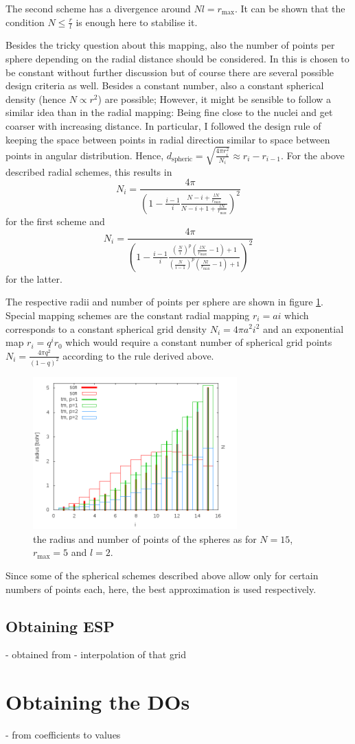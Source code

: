 The second scheme has a divergence around $Nl=r_\text{max}$. 
It can be shown that the condition $N\leq \frac rl $ is enough here to stabilise it.

Besides the tricky question about this mapping, also the number of points per sphere depending on the radial distance should be considered. 
In \cite{Son_Chu0} this is chosen to be constant without further discussion but of course there are several possible design criteria as well.
Besides a constant number, also a constant spherical density (hence $N\propto r^2$) are possible; However, it might be sensible to follow a similar idea than in the radial mapping: Being fine close to the nuclei and get coarser with increasing distance.
In particular, I followed the design rule of keeping the space between points in radial direction similar to space between points in angular distribution.
Hence, $d_\text{spheric}=\sqrt{\frac{4\pi r_i^2}{N_i}}\approx r_i-r_{i-1}$.
For the above described radial schemes, this results in 
\[
N_i= \frac{4\pi}{ \left(1-\frac{i-1 }{i}\frac{N-i+\frac{lN}{r_\text{max}}}{N-i+1+\frac{lN}{r_\text{max}}}\right)^2 }
\]
for the first scheme and 
\[
N_i= \frac{4\pi}{\left(1-\frac{i-1 }{i}\frac{ (\frac{N}{i})^p \left(\frac{lN}{r_\text{max}}-1\right)+1}{ (\frac{N}{i-1})^p\left( \frac{Nl}{r_\text{max}} -1 \right) +1 } \right)^2 }
\]
for the latter.

The respective radii and number of points per sphere are shown in figure \ref{fig:maps}.\\
Special mapping schemes are the constant radial mapping $r_i=a i$ which corresponds to a constant spherical grid density $N_i=4\pi a^2 i^2$ and an exponential map $r_i=q^i r_0$ which would require a constant number of spherical grid points $N_i=\frac{4\pi q^2}{(1-q)^2}$ according to the rule derived above.

\begin{figure}
\includegraphics[width=0.7\textwidth]{Figures/RadialMap}
\caption{the radius and number of points of the spheres as for $N=15$, $r_\text{max}=5$ and $l=2$.}
\label{fig:maps}
\end{figure}

Since some of the spherical schemes described above allow only for certain numbers of points each, here, the best approximation is used respectively.

\subsection{Obtaining ESP}
 - obtained from 
 - interpolation of that grid

\section{Obtaining the DOs}
 - from coefficients to values
